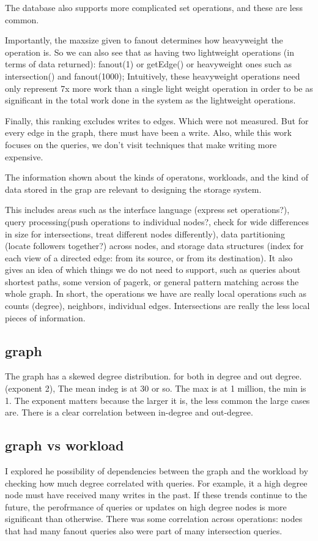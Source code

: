 \documentclass[11pt]{article}
\begin{document}
The database also supports more complicated set operations, and these are less common.

Importantly, the maxsize given to fanout determines how heavyweight the operation is. So we can also see that
as having two lightweight operations (in terms of data returned): fanout(1) or getEdge() or heavyweight ones such as
intersection() and fanout(1000); Intuitively, these heavyweight operations need only represent 7x more work than a single light weight operation in order to be as significant in the total work done in the system as the lightweight operations.

Finally, this ranking excludes writes to edges. Which were not measured. But for every edge in the graph, there must have been a write. Also, while this work focuses on the queries, we don't visit techniques that make writing more expensive.

The information shown about the kinds of operatons, workloads, and the kind of data stored in the grap are relevant to designing the storage system. 

This includes  areas such as the interface language (express set operations?), query processing(push operations to individual nodes?, check for wide differences in size for intersections, treat different nodes differently), data partitioning (locate followers together?) across nodes, and storage data structures (index for each view of a directed edge: from its source, or  from its destination). It also gives an idea of which things we do not need to support, such as queries about shortest paths, some version of pagerk, or general pattern matching across the whole graph. In short, the operations we have are really local operations such as counts (degree), neighbors, individual edges. Intersections are really the less local pieces of information.

\subsection{graph}
The graph has a skewed degree distribution. for both in degree and out degree.(exponent 2),  The mean indeg is at 30 or so. The max is at 1 million, 
the min is 1. The exponent matters because the larger it is, the less common the large cases are.  There is a clear correlation between in-degree and out-degree. 



\subsection{graph vs workload}
I explored he possibility of dependencies between the graph and the workload by checking how much degree correlated with queries.
For example, it a high degree node must have received many writes in the past. If these trends continue to the future, the perofrmance of 
queries or updates on high degree nodes is more significant than otherwise.  There was  some correlation across operations: nodes that had many 
fanout queries also were part of many intersection queries.
\end{document}
